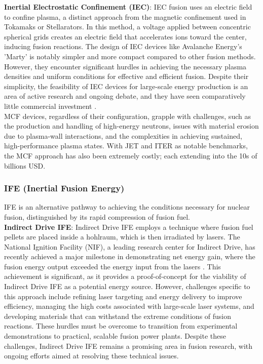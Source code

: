 \textbf{Inertial Electrostatic Confinement (IEC)}: IEC fusion uses an electric field to confine plasma, a distinct approach from the magnetic confinement used in Tokamaks or Stellarators. In this method, a voltage applied between concentric spherical grids creates an electric field that accelerates ions toward the center, inducing fusion reactions. The design of IEC devices like Avalanche Energy's 'Marty' is notably simpler and more compact compared to other fusion methods. However, they encounter significant hurdles in achieving the necessary plasma densities and uniform conditions for effective and efficient fusion. Despite their simplicity, the feasibility of IEC devices for large-scale energy production is an area of active research and ongoing debate, and they have seen comparatively little commercial investment \cite{miley2014inertial}.\\


MCF devices, regardless of their configuration, grapple with challenges, such as the production and handling of high-energy neutrons, issues with material erosion due to plasma-wall interactions, and the complexities in achieving sustained, high-performance plasma states. With JET and ITER as notable benchmarks, the MCF approach has also been extremely costly; each extending into the 10s of billions USD.

\subsubsection{IFE (Inertial Fusion Energy)}

IFE is an alternative pathway to achieving the conditions necessary for nuclear fusion, distinguished by its rapid compression of fusion fuel.\\



\textbf{Indirect Drive IFE}: Indirect Drive IFE employs a technique where fusion fuel pellets are placed inside a hohlraum, which is then irradiated by lasers. The National Ignition Facility (NIF), a leading research center for Indirect Drive, has recently achieved a major milestone in demonstrating net energy gain, where the fusion energy output exceeded the energy input from the lasers \cite{miller2004national}. This achievement is significant, as it provides a proof-of-concept for the viability of Indirect Drive IFE as a potential energy source. However, challenges specific to this approach include refining laser targeting and energy delivery to improve efficiency, managing the high costs associated with large-scale laser systems, and developing materials that can withstand the extreme conditions of fusion reactions. These hurdles must be overcome to transition from experimental demonstrations to practical, scalable fusion power plants. Despite these challenges, Indirect Drive IFE remains a promising area in fusion research, with ongoing efforts aimed at resolving these technical issues.\\

